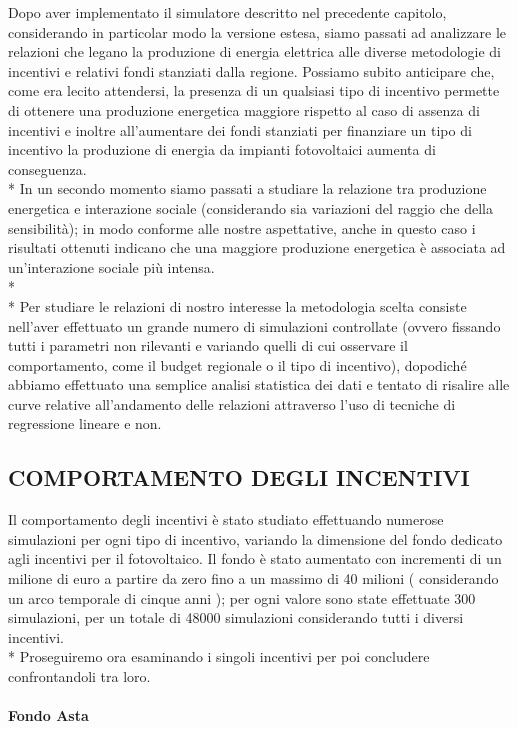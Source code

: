 \documentclass[12pt,a4paper,openright,twoside]{report}
\newcommand{\myparagraph}[1]{\paragraph{#1}\mbox{}\\}
\begin{document}
Dopo aver implementato il simulatore descritto nel precedente capitolo, considerando in particolar modo la versione estesa, siamo passati ad analizzare le relazioni che legano la produzione di energia elettrica alle diverse metodologie di incentivi e relativi fondi stanziati dalla regione. Possiamo subito anticipare che, come era lecito attendersi, la presenza di un qualsiasi tipo di incentivo permette di ottenere una produzione energetica maggiore rispetto al caso di assenza di incentivi e inoltre all'aumentare dei fondi stanziati per finanziare un tipo di incentivo la produzione di energia da impianti fotovoltaici aumenta di conseguenza.\\*
In un secondo momento siamo passati a studiare la relazione tra produzione energetica e interazione sociale (considerando sia variazioni del raggio che della sensibilità); in modo conforme alle nostre aspettative, anche in questo caso i risultati ottenuti indicano che una maggiore produzione energetica è associata ad un'interazione sociale più intensa.\\* \\*
Per studiare le relazioni di nostro interesse la metodologia scelta consiste nell'aver effettuato un grande numero di simulazioni controllate (ovvero fissando tutti i parametri non rilevanti e variando quelli di cui osservare il comportamento, come il budget regionale o il tipo di incentivo), dopodiché abbiamo effettuato una semplice analisi statistica dei dati e tentato di risalire alle curve relative all'andamento delle relazioni attraverso l'uso di tecniche di regressione lineare e non.


\subsection{COMPORTAMENTO DEGLI INCENTIVI}

Il comportamento degli incentivi è stato studiato effettuando numerose simulazioni per ogni tipo di incentivo, variando la dimensione del fondo dedicato agli incentivi per il fotovoltaico. Il fondo è stato aumentato con incrementi di un milione di euro a partire da zero  fino a un massimo di 40 milioni ( considerando un arco temporale di cinque anni ); per ogni valore sono state effettuate 300 simulazioni, per un totale di 48000 simulazioni considerando tutti i diversi incentivi.\\*
Proseguiremo ora esaminando i singoli incentivi per poi concludere confrontandoli tra loro.

\myparagraph{Fondo Asta}
\end{document}
